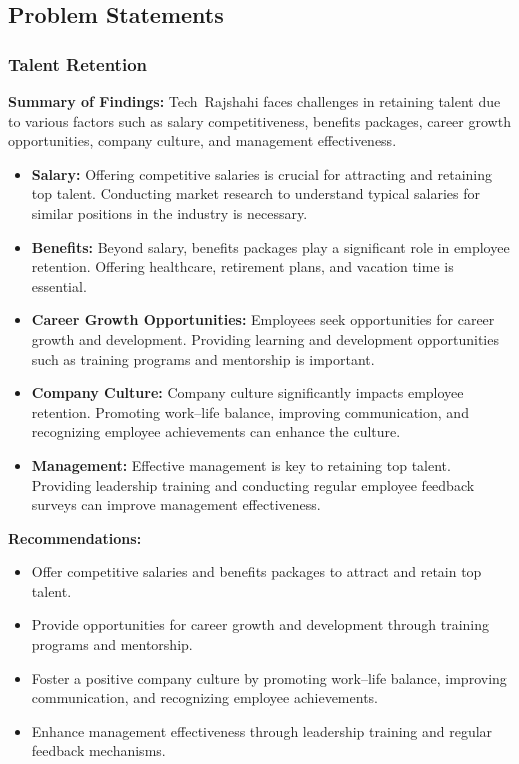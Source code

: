 \documentclass[12pt,a4paper]{article}
\begin{document}
\subsection{Problem Statements}

\subsubsection{Talent Retention}
\textbf{Summary of Findings:} Tech Rajshahi faces challenges in retaining talent due to various factors such as salary competitiveness, benefits packages, career growth opportunities, company culture, and management effectiveness.
\begin{itemize}
    \item \textbf{Salary:} Offering competitive salaries is crucial for attracting and retaining top talent.  Conducting market research to understand typical salaries for similar positions in the industry is necessary.
    \item \textbf{Benefits:} Beyond salary, benefits packages play a significant role in employee retention.  Offering healthcare, retirement plans, and vacation time is essential.
    \item \textbf{Career Growth Opportunities:} Employees seek opportunities for career growth and development.  Providing learning and development opportunities such as training programs and mentorship is important.
    \item \textbf{Company Culture:} Company culture significantly impacts employee retention.  Promoting work–life balance, improving communication, and recognizing employee achievements can enhance the culture.
    \item \textbf{Management:} Effective management is key to retaining top talent.  Providing leadership training and conducting regular employee feedback surveys can improve management effectiveness.
\end{itemize}
\textbf{Recommendations:}
\begin{itemize}
    \item Offer competitive salaries and benefits packages to attract and retain top talent.
    \item Provide opportunities for career growth and development through training programs and mentorship.
    \item Foster a positive company culture by promoting work–life balance, improving communication, and recognizing employee achievements.
    \item Enhance management effectiveness through leadership training and regular feedback mechanisms.
\end{itemize}
\end{document}
